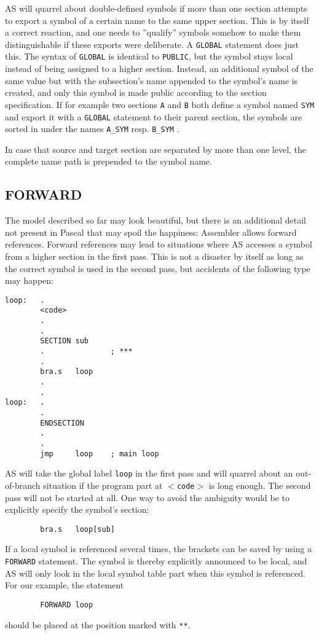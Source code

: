 \documentclass[12pt,twoside]{report}
\makeatletter
\newcommand{\tty}[1]{{\tt #1}}
\newcommand{\ttindex}[1]{\index{#1@{\tt #1}}}
\makeatother
\begin{document}
AS will quarrel about double-defined symbols if more than one section
attempts to export a symbol of a certain name to the same upper section. 
This is by itself a correct reaction, and one needs to ''qualify'' symbols
somehow to make them distinguishable if these exports were deliberate.  A
\tty{GLOBAL} statement does just this.  The syntax of \tty{GLOBAL} is
identical to \tty{PUBLIC}, but the symbol stays local instead of being
assigned to a higher section.  Instead, an additional symbol of the same
value but with the subsection's name appended to the symbol's name is
created, and only this symbol is made public according to the section
specification.  If for example two sections \tty{A} and \tty{B} both
define a symbol named \tty{SYM} and export it with a \tty{GLOBAL}
statement to their parent section, the symbols are sorted in under the
names \tty{A\_SYM} resp. \tty{B\_SYM} .

In case that source and target section are separated by more than one
level, the complete name path is prepended to the symbol name.


\subsection{FORWARD}
\ttindex{FORWARD}

The model described so far may look beautiful, but there is an
additional detail not present in Pascal that may spoil the happiness:
Assembler allows forward references.  Forward references may lead to
situations where AS accesses a symbol from a higher section in the
first pass.  This is not a disaster by itself as long as the correct
symbol is used in the second pass, but accidents of the following
type may happen:
\begin{verbatim}
loop:   .
        <code>
        .
        .
        SECTION sub
        .               ; ***
        .
        bra.s   loop
        .
        .
loop:   .
        .
        ENDSECTION
        .
        .
        jmp     loop    ; main loop
\end{verbatim}
AS will take the global label \tty{loop} in the first pass and will
quarrel about an out-of-branch situation if the program part at
\tty{$<$code$>$} is long enough.  The second pass will not be
started at all.  One way to avoid the ambiguity would be to
explicitly specify the symbol's section:
\begin{verbatim}
        bra.s   loop[sub]
\end{verbatim}
If a local symbol is referenced several times, the brackets can be saved
by using a \tty{FORWARD} statement.  The symbol is thereby explicitly
announced to be local, and AS will only look in the local symbol table
part when this symbol is referenced.  For our example, the statement
\begin{verbatim}
        FORWARD loop
\end{verbatim}
should be placed at the position marked with \tty{***}.
\end{document}

